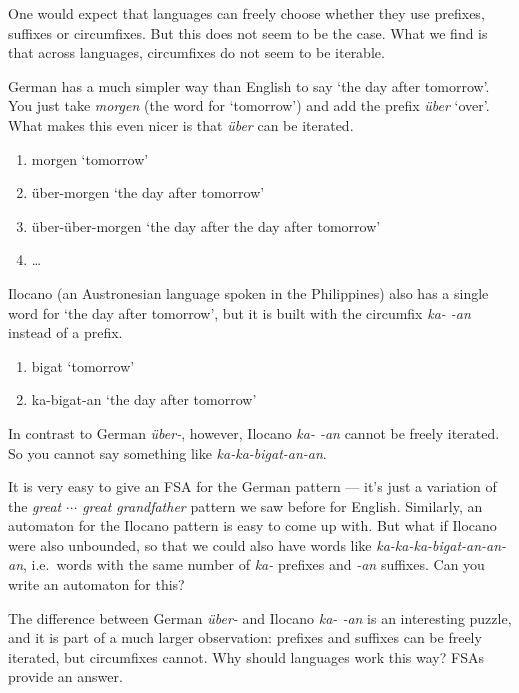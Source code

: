 One would expect that languages can freely choose whether they use prefixes, suffixes or circumfixes.
But this does not seem to be the case.
What we find is that across languages, circumfixes do not seem to be iterable.
%
\begin{examplebox}
    German has a much simpler way than English to say `the day after tomorrow'.
    You just take \emph{morgen} (the word for `tomorrow') and add the prefix \emph{über} `over'.
    What makes this even nicer is that \emph{über} can be iterated.
    \begin{enumerate}
        \item morgen `tomorrow'
        \item über-morgen `the day after tomorrow'
        \item über-über-morgen `the day after the day after tomorrow'
        \item \ldots
    \end{enumerate}
    Ilocano (an Austronesian language spoken in the Philippines) also has a single word for `the day after tomorrow', but it is built with the circumfix \emph{ka- -an} instead of a prefix.
    \begin{enumerate}
        \item bigat `tomorrow'
        \item ka-bigat-an `the day after tomorrow'
    \end{enumerate}
    In contrast to German \emph{über-}, however, Ilocano \emph{ka- -an} cannot be freely iterated.
    So you cannot say something like \emph{ka-ka-bigat-an-an}.
\end{examplebox}
%
\begin{homework}
    It is very easy to give an FSA for the German pattern --- it's just a variation of the \emph{great $\cdots$ great grandfather} pattern we saw before for English.
    Similarly, an automaton for the Ilocano pattern is easy to come up with.
    But what if Ilocano were also unbounded, so that we could also have words like \emph{ka-ka-ka-bigat-an-an-an}, i.e.\ words with the same number of \emph{ka-} prefixes and \emph{-an} suffixes.
    Can you write an automaton for this?
\end{homework}
%
The difference between German \emph{über-} and Ilocano \emph{ka- -an} is an interesting puzzle, and it is part of a much larger observation: prefixes and suffixes can be freely iterated, but circumfixes cannot.
Why should languages work this way?
FSAs provide an answer.


